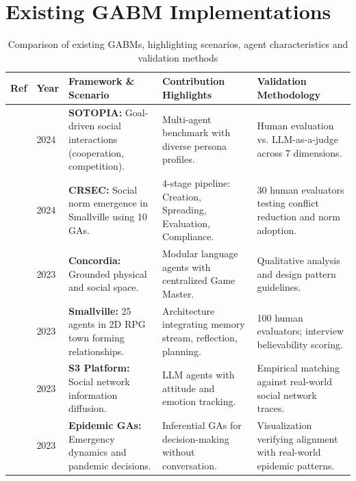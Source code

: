 \documentclass[12pt,a4paper]{report}
\begin{document}
\section{Existing GABM Implementations}
\label{sec:prominent_gabms}

\begin{table}[H]
\centering
\vspace{-0.5cm}
\caption{Comparison of existing GABMs, highlighting scenarios, agent characteristics and validation methods}
\label{tab:table2_gabms}
\vspace{0.1cm}
\setlength{\tabcolsep}{3.5pt}
\renewcommand{\arraystretch}{1.05}
\footnotesize
\begin{tabular}{|p{0.8cm}|p{0.8cm}|p{3.8cm}|p{4.2cm}|p{4.4cm}|}
\hline
\textbf{Ref} & \textbf{Year} & \textbf{Framework \& Scenario} & \textbf{Contribution Highlights} & \textbf{Validation Methodology} \\
\hline
\cite{sotopia2024} & 2024 & \textbf{SOTOPIA:} Goal-driven social interactions (cooperation, competition). & Multi-agent benchmark with diverse persona profiles. & Human evaluation vs. LLM-as-a-judge across 7 dimensions. \\
\hline
\cite{socialnorms2024} & 2024 & \textbf{CRSEC:} Social norm emergence in Smallville using 10 GAs. & 4-stage pipeline: Creation, Spreading, Evaluation, Compliance. & 30 human evaluators testing conflict reduction and norm adoption. \\
\hline
\cite{concordia2023} & 2023 & \textbf{Concordia:} Grounded physical and social space. & Modular language agents with centralized Game Master. & Qualitative analysis and design pattern guidelines. \\
\hline
\cite{park2023generative} & 2023 & \textbf{Smallville:} 25 agents in 2D RPG town forming relationships. & Architecture integrating memory stream, reflection, planning. & 100 human evaluators; interview believability scoring. \\
\hline
\cite{s32023} & 2023 & \textbf{S3 Platform:} Social network information diffusion. & LLM agents with attitude and emotion tracking. & Empirical matching against real-world social network traces. \\
\hline
\cite{adornetto2025generative} & 2023 & \textbf{Epidemic GAs:} Emergency dynamics and pandemic decisions. & Inferential GAs for decision-making without conversation. & Visualization verifying alignment with real-world epidemic patterns. \\
\hline
\end{tabular}
\end{table}
\end{document}
